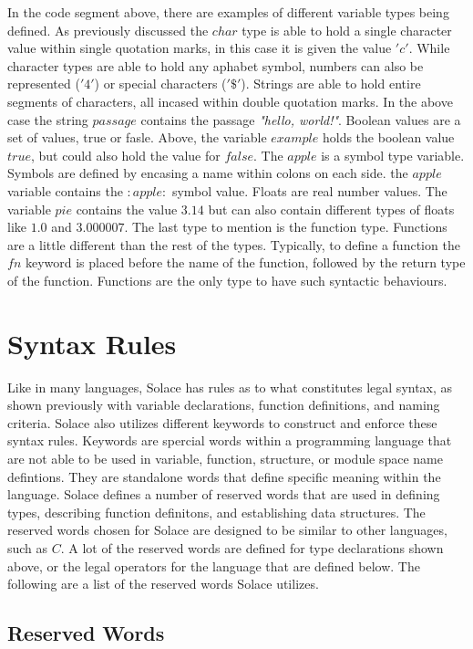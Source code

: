 \documentclass{article}
\begin{document}
In the code segment above, there are examples of different variable types being defined. As previously discussed the $char$ type is able to hold a single character value
within single quotation marks, in this case it is given the value $'c'$. While character types are able to hold any aphabet symbol, numbers can also be represented ($'4'$)
or special characters ($'\$'$). Strings are able to hold entire segments of characters, all incased within double quotation marks. In the above case the string $passage$
contains the passage \textit{"hello, world!"}. Boolean values are a set of values, true or fasle. Above, the variable $example$ holds the boolean value $true$, but could also
hold the value for $false$. The $apple$ is a symbol type variable. Symbols are defined by encasing a name within colons on each side. the $apple$ variable contains the $:apple:$
symbol value. Floats are real number values. The variable $pie$ contains the value $3.14$ but can also contain different types of floats like $1.0$ and $3.000007$. The last 
type to mention is the function type. Functions are a little different than the rest of the types. Typically, to define a function the $fn$ keyword is placed before the
name of the function, followed by the return type of the function. Functions are the only type to have such syntactic behaviours.


\section{Syntax Rules}

Like in many languages, Solace has rules as to what constitutes legal syntax, as shown previously with variable declarations, function definitions, and naming criteria. Solace
also utilizes different keywords to construct and enforce these syntax rules. Keywords are spercial words within a programming language that are not able to be used in variable,
function, structure, or module space name defintions. They are standalone words that define specific meaning within the language.
Solace defines a number of reserved words that are used in defining types, describing function definitons, and establishing data structures. The reserved words chosen
for Solace are designed to be similar to other languages, such as $C$. A lot of the reserved words are defined for type declarations shown above, or the legal operators for the 
language that are defined below. The following are a list of the reserved words Solace utilizes.


\subsection{Reserved Words}
\end{document}
